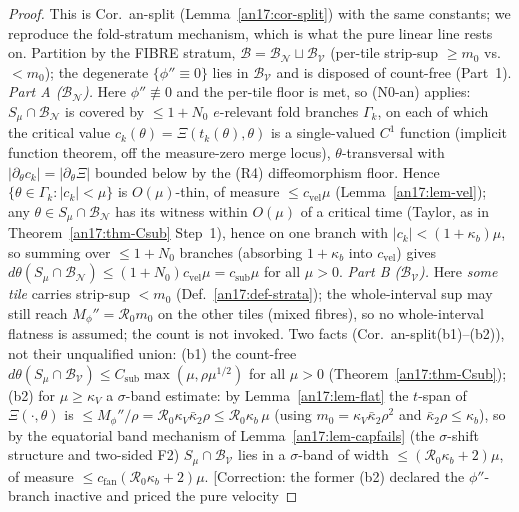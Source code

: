 \begin{proof}
This is Cor.~an-split (Lemma~\ref{an17:cor-split}) with the same constants; we
reproduce the fold-stratum mechanism, which is what the pure linear line rests on.
Partition by the FIBRE stratum, $\mathcal B=\mathcal B_{\mathcal N}\sqcup\mathcal
B_{\mathcal V}$ (per-tile strip-sup $\ge m_0$ vs.\ $<m_0$); the degenerate
$\{\phi''\equiv0\}$ lies in $\mathcal B_{\mathcal V}$ and is disposed of count-free
(Part~1). \emph{Part A ($\mathcal B_{\mathcal N}$).} Here $\phi''\not\equiv0$ and
the per-tile floor is met, so (N0-an) applies: $S_\mu\cap\mathcal B_{\mathcal N}$ is
covered by $\le1+N_0$ $e$-relevant fold branches $\Gamma_k$, on each of which the
critical value $c_k(\theta)=\Xi(t_k(\theta),\theta)$ is a single-valued $C^1$
function (implicit function theorem, off the measure-zero merge locus),
$\theta$-transversal with $|\partial_\theta c_k|=|\partial_\theta\Xi|$ bounded below
by the (R4) diffeomorphism floor. Hence $\{\theta\in\Gamma_k:|c_k|<\mu\}$ is
$O(\mu)$-thin, of measure $\le c_{\mathrm{vel}}\mu$ (Lemma~\ref{an17:lem-vel}); any
$\theta\in S_\mu\cap\mathcal B_{\mathcal N}$ has its witness within $O(\mu)$ of a
critical time (Taylor, as in Theorem~\ref{an17:thm-Csub} Step~1), hence on one
branch with $|c_k|<(1+\kappa_b)\mu$, so summing over $\le1+N_0$ branches (absorbing
$1+\kappa_b$ into $c_{\mathrm{vel}}$) gives $d\theta(S_\mu\cap\mathcal B_{\mathcal
N})\le(1+N_0)c_{\mathrm{vel}}\mu=c_{\mathrm{sub}}\mu$ for all $\mu>0$. \emph{Part B
($\mathcal B_{\mathcal V}$).} Here \emph{some tile} carries strip-sup $<m_0$
(Def.~\ref{an17:def-strata}); the whole-interval sup may still reach
$M_\phi''=\mathcal R_0m_0$ on the other tiles (mixed fibres), so no
whole-interval flatness is assumed; the count is not invoked. Two facts (Cor.~an-split(b1)--(b2)), not their
unqualified union: (b1) the count-free $d\theta(S_\mu\cap\mathcal B_{\mathcal V})\le
C_{\mathrm{sub}}\max(\mu,\rho\mu^{1/2})$ for all $\mu>0$
(Theorem~\ref{an17:thm-Csub}); (b2) for $\mu\ge\kappa_V$ a $\sigma$-band estimate: by
Lemma~\ref{an17:lem-flat} the $t$-span of $\Xi(\cdot,\theta)$ is $\le
M_\phi''/\rho=\mathcal R_0\kappa_V\bar\kappa_2\rho\le\mathcal R_0\kappa_b\,\mu$
(using $m_0=\kappa_V\bar\kappa_2\rho^2$ and $\bar\kappa_2\rho\le\kappa_b$), so by
the equatorial band mechanism of Lemma~\ref{an17:lem-capfails} (the
$\sigma$-shift structure and two-sided F2) $S_\mu\cap\mathcal B_{\mathcal V}$
lies in a $\sigma$-band of width $\le(\mathcal R_0\kappa_b+2)\mu$, of measure
$\le c_{\mathrm{fan}}(\mathcal R_0\kappa_b+2)\mu$. \textup{[Correction: the
former (b2) declared the $\phi''$-branch inactive and priced the pure velocity
}
\end{proof}
